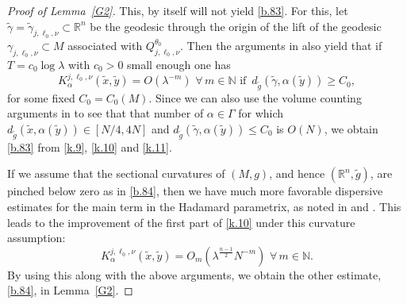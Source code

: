 \documentclass[10pt]{amsart}
\newcommand{\Rn}{{\mathbb R}^n}
\newcommand{\la}{\lambda}
\newcommand{\1}{{\bf 1}}
\begin{document}
\begin{proof}[Proof of Lemma~\ref{G2}]
This, by itself will not yield \eqref{b.83}.  For this, let $\tilde \gamma =\tilde \gamma_{j,\ell_0,\nu}\subset \Rn$
be the geodesic through the origin of the lift of the geodesic $\gamma_{j,\ell_0,\nu}\subset M$ associated
with $Q^{\theta_0}_{j,\ell_0,\nu}$.  Then the arguments in \cite{BSTop} also yield that if
$T=c_0\log\la$ with $c_0>0$ small enough one has
\begin{equation}\label{k.11}
K^{j,\ell_0,\nu}_\alpha(\tilde x,\tilde y) =O(\la^{-m}) \, \,
\forall \, m\in {\mathbb N} \, \, \text{if } \,
d_{\tilde g}(\tilde \gamma, \alpha(\tilde y))\ge C_0,
\end{equation}
for some fixed $C_0=C_0(M)$.  Since we can also use the volume counting arguments in \cite{BSTop} to see that
that number of $\alpha\in \Gamma$ for which $d_{\tilde g}(\tilde x,\alpha (\tilde y))\in [N/4,4N]$
and $d_{\tilde g}(\tilde \gamma, \alpha(\tilde y))\le C_0$ is $O(N)$, we obtain 
\eqref{b.83} from \eqref{k.9}, \eqref{k.10} and \eqref{k.11}.


If we assume that the sectional curvatures of $(M,g)$, and hence $(\Rn,\tilde g)$, are pinched below zero as in
\eqref{b.84}, then we have much more favorable dispersive estimates for the main term in the Hadamard parametrix,
as noted in \cite{BHSsp} and \cite{HSp}.  This leads to the improvement of the first part of \eqref{k.10} under this
curvature assumption:
\begin{equation}\label{k.12}
K^{j,\ell_0,\nu}_\alpha(\tilde x,\tilde y)=O_m(\la^{\frac{n-1}2}N^{-m}) \, \, \forall \, m\in {\mathbb N}.
\end{equation}
By using this along with the above arguments, we obtain the other estimate, \eqref{b.84}, in
Lemma~\ref{G2}.
\end{proof}
\end{document}
